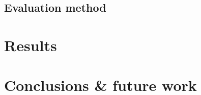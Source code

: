 \documentclass[xcolor={dvipsnames}]{beamer}
\begin{document}
\subsection{Evaluation method}
\begin{frame}
\end{frame}

\section{Results}
\begin{frame}
\end{frame}
\begin{frame}
\end{frame}

\section{Conclusions \& future work}
\begin{frame}
\end{frame}
\end{document}
